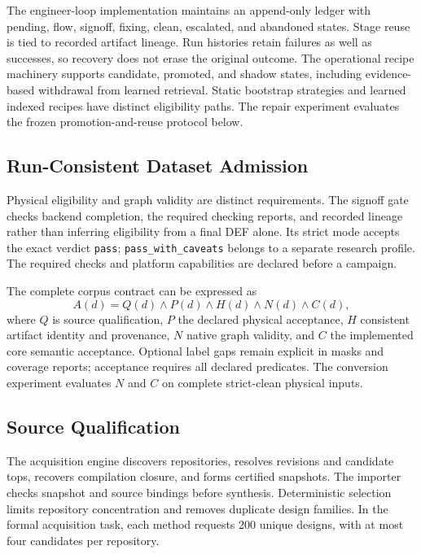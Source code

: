 The engineer-loop implementation maintains an append-only ledger with pending, flow, signoff, fixing, clean, escalated, and abandoned states. Stage reuse is tied to recorded artifact lineage. Run histories retain failures as well as successes, so recovery does not erase the original outcome. The operational recipe machinery supports candidate, promoted, and shadow states, including evidence-based withdrawal from learned retrieval. Static bootstrap strategies and learned indexed recipes have distinct eligibility paths. The repair experiment evaluates the frozen promotion-and-reuse protocol below.

\subsection{Run-Consistent Dataset Admission}
Physical eligibility and graph validity are distinct requirements. The signoff gate checks backend completion, the required checking reports, and recorded lineage rather than inferring eligibility from a final DEF alone. Its strict mode accepts the exact verdict \texttt{pass}; \texttt{pass\_with\_caveats} belongs to a separate research profile. The required checks and platform capabilities are declared before a campaign.

The complete corpus contract can be expressed as
\begin{equation}
A(d)=Q(d)\land P(d)\land H(d)\land N(d)\land C(d),
\end{equation}
where $Q$ is source qualification, $P$ the declared physical acceptance, $H$ consistent artifact identity and provenance, $N$ native graph validity, and $C$ the implemented core semantic acceptance. Optional label gaps remain explicit in masks and coverage reports; acceptance requires all declared predicates. The conversion experiment evaluates $N$ and $C$ on complete strict-clean physical inputs.

\subsection{Source Qualification}
The acquisition engine discovers repositories, resolves revisions and candidate tops, recovers compilation closure, and forms certified snapshots. The importer checks snapshot and source bindings before synthesis. Deterministic selection limits repository concentration and removes duplicate design families. In the formal acquisition task, each method requests 200 unique designs, with at most four candidates per repository.

